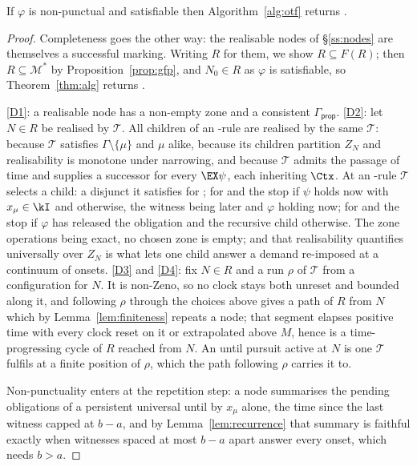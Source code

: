 \begin{theorem}[Completeness]\label{thm:completeness}
If $\varphi$ is non-punctual and satisfiable then Algorithm~\ref{alg:otf} returns \SAT.
\end{theorem}
\begin{proof}
Completeness goes the other way: the realisable nodes of \S\ref{ss:nodes} are themselves a successful
marking. Writing $R$ for them, we show $R\subseteq F(R)$; then $R\subseteq\mathcal M^{*}$ by
Proposition~\ref{prop:gfp}, and $N_0\in R$ as $\varphi$ is satisfiable, so Theorem~\ref{thm:alg}
returns \SAT.

\ref{D1}: a realisable node has a non-empty zone and a consistent $\Gamma_{\mathsf{prop}}$.
\ref{D2}: let $N\in R$ be realised by $\mathcal T$. All children of an \ANDn-rule are realised by the
same $\mathcal T$:  because $\mathcal T$ satisfies $\Gamma\setminus\{\mu\}$ and $\mu$
alike,  because its children partition $Z_N$ and realisability is monotone under
narrowing,  and  because $\mathcal T$ admits the passage of time and
supplies a successor for every $\EX\psi$, each inheriting $\Ctx$. At an \ORn-rule $\mathcal T$ selects
a child: a disjunct it satisfies for ; for  and  the
stop if $\psi$ holds now with $x_\mu\in\kI$ and  otherwise, the witness being later and
$\varphi$ holding now; for  and  the stop if $\varphi$ has
released the obligation and the recursive child otherwise. The zone operations being exact, no chosen
zone is empty; and that realisability quantifies universally over $Z_N$ is what lets one child answer
a demand re-imposed at a continuum of onsets.
\ref{D3} and \ref{D4}: fix $N\in R$ and a run $\rho$ of $\mathcal T$ from a configuration for $N$. It
is non-Zeno, so no clock stays both unreset and bounded along it, and following $\rho$ through the
choices above gives a path of $R$ from $N$ which by Lemma~\ref{lem:finiteness} repeats a node; that
segment elapses positive time with every clock reset on it or extrapolated above $M$, hence is a
time-progressing cycle of $R$ reached from $N$. An until pursuit active at $N$ is one $\mathcal T$
fulfils at a finite position of $\rho$, which the path following $\rho$ carries it to.

Non-punctuality enters at the repetition step: a node summarises the pending obligations of a
persistent universal until by $x_\mu$ alone, the time since the last witness capped at $b-a$, and by
Lemma~\ref{lem:recurrence} that summary is faithful exactly when witnesses spaced at most $b-a$ apart
answer every onset, which needs $b>a$.
\end{proof}


